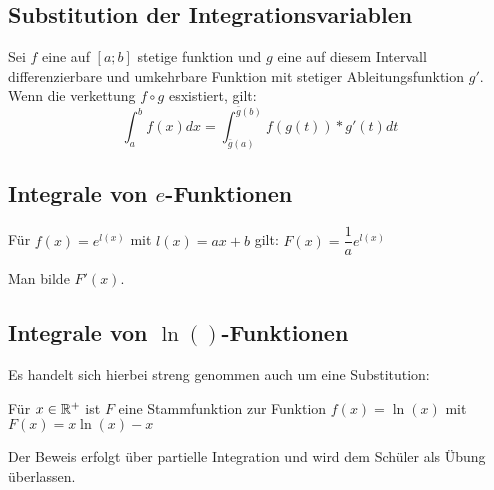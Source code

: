 \subsection{Substitution der Integrationsvariablen}
\begin{Theorem}
  Sei $f$ eine auf $[a;b]$ stetige funktion und $g$ eine auf diesem Intervall differenzierbare und umkehrbare Funktion mit stetiger
  Ableitungsfunktion $g'$. Wenn die verkettung $f \circ g$ esxistiert, gilt:
  $$\int_a^b f(x)dx=\int_{\bar g (a)}^{\bar g (b)}f(g(t))*g'(t)dt$$
\end{Theorem}

\subsection{Integrale von $e$-Funktionen}
\begin{Theorem}
  Für $f(x)=e^{l(x)}$ mit $l(x) = ax+b$ gilt: $F(x) = \dfrac{1}{a}e^{l(x)}$
\end{Theorem}
\begin{Beweis}
  Man bilde $F'(x)$.
\end{Beweis}
\subsection{Integrale von $\ln()$-Funktionen}
Es handelt sich hierbei streng genommen auch um eine Substitution:
\begin{Theorem}
  Für $x \in \mathbb{R}^{+}$ ist $F$ eine Stammfunktion zur Funktion $f(x) = \ln(x)$ mit $F(x) = x \ln(x)-x$
\end{Theorem}
\begin{Beweis}
  Der Beweis erfolgt über partielle Integration und wird dem Schüler als Übung überlassen.
\end{Beweis}
